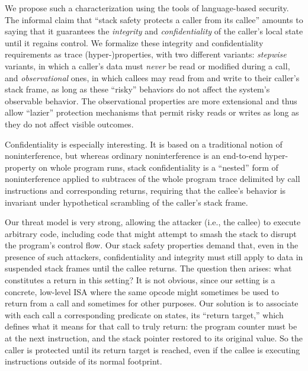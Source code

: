 \documentclass[acmtog,review,anonymous]{acmart}\settopmatter{printfolios=true,printccs=false,printacmref=false}
\begin{document}
We propose such a characterization
using the tools of language-based security. The informal claim that
``stack safety protects a caller from its callee'' amounts to saying
that it guarantees
the {\em integrity} and {\em confidentiality} of the caller's local state
until it regains control.
%
We formalize these integrity and confidentiality requirements as trace
(hyper-)properties, with two different
variants: {\em stepwise} variants, in which a caller's data must {\em never} be
read or modified during a call, and {\em observational} ones, in which
callees may read from and write to their caller's stack frame, as
long as these ``risky'' behaviors do not affect the system's observable
behavior. The observational properties are more extensional and thus
allow ``lazier'' protection mechanisms that permit risky reads or
writes as long as they do not affect visible outcomes.

Confidentiality is especially interesting.  It is based on a traditional
notion of noninterference, but whereas ordinary noninterference is
an end-to-end hyper-property on whole program runs, stack confidentiality is
a ``nested'' form of
noninterference applied to
subtraces of the whole program trace delimited by call instructions and
corresponding returns, requiring that the callee's behavior is invariant
under hypothetical scrambling of the caller's stack frame.

Our threat model is very strong, allowing the attacker (i.e., the callee) to
execute arbitrary code, including code that might attempt to smash
the stack to disrupt the program's control flow.
Our stack safety properties demand that, even in the presence of such
attackers, confidentiality and integrity must
still apply to data in suspended stack frames until the callee returns.
The question then arises:
what constitutes a return in this setting? It is not obvious, since our
setting is a concrete, low-level ISA where the same opcode might sometimes
be used to return from a call and sometimes for other purposes.
Our solution is to associate with each call a corresponding predicate on states,
its ``return target,''
which defines what it means for that call to truly return: the program counter
must be at the next instruction, and the stack pointer restored to its original
value.
So the caller is protected until its return target is reached, even if the callee is
executing instructions outside of its normal footprint.
\end{document}
